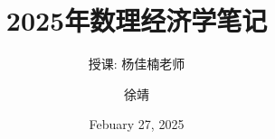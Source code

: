     

\documentclass[lang=cn,10pt,green]{elegantbook} 
\title{2025年数理经济学笔记}
\subtitle{授课: 杨佳楠老师}

\author{徐靖}
\date{Febuary 27, 2025}


\setcounter{tocdepth}{3}


\usepackage{array}
\newcommand{\ccr}[1]{\makecell{{\color{#1}\rule{1cm}{1cm}}}}




\maketitle
\frontmatter

\tableofcontents

\mainmatter

\chapter{Multi-Variable Unconstrained Optimization}

\begin{introduction}[Keywords]
    \item First Order Condition 一阶条件
    \item Bisection Method 二分法
    \item Newton's Method 牛顿法
\end{introduction}

\section{First Order Condition}
An Unconstrained Optimization Problem is :
$$\min_{x \in \mathbb{R}^n} f(x)$$

\begin{definition}
    \textbf{First Order Condition (FOC)}:  $\nabla f(x^*) = 0$.
    \begin{itemize}
        \item $x^*$ is a \textbf{stationary point} (驻点) of $f$.
        \item It is necessary but not sufficient.
    \end{itemize}
    \textbf{global minimum}: $f(x^*) \leq f(x)$ for all $x \in {}^n$.
    
    \textbf{local minimum}: $f(x^*) \leq f(x)$ for all $x \in B(x^*, \epsilon)$ for some $\epsilon > 0$.
\end{definition}

